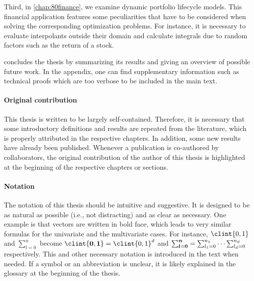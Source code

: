 Third, in \cref{chap:80finance},
we examine dynamic portfolio lifecycle models.
This financial application features some peculiarities that have
to be considered when solving the corresponding optimization problems.
For instance, it is necessary to evaluate interpolants outside their domain
and calculate integrals due to random factors such as the return of a stock.

 concludes the thesis by
summarizing its results and giving an overview of possible future work.
In the appendix, one can find supplementary information such as
technical proofs which are too verbose to be included in the main text.

\paragraph{Original contribution}

This thesis is written to be largely self-contained.
Therefore, it is necessary that some introductory definitions and
results are repeated from the literature,
which is properly attributed in the respective chapters.
In addition, some new results have already been published.
Whenever a publication is co-authored by collaborators,
the original contribution of the author of this thesis is highlighted
at the beginning of the respective chapters or sections.

\paragraph{Notation}

The notation of this thesis should be intuitive and suggestive.
It is designed to be as natural as possible (i.e., not distracting)
and as clear as necessary.
One example is that vectors are written in bold face, which leads to
very similar formulas for the univariate and the multivariate cases.
For instance, $\clint{0, 1}$ and $\sum_{l=0}^n$
become
$\clint{\*0, \*1} = \clint{0, 1}^d$ and
$\sum_{{\boldsymbol{l}}={\boldsymbol{0}}}^{{\boldsymbol{n}}} = \sum_{l_1=0}^{n_1} \dotsb \sum_{l_d=0}^{n_d}$
respectively.
This and other necessary notation is introduced in the text when needed.
If a symbol or an abbreviation is unclear,
it is likely explained in the glossary at the beginning of the thesis.

\cleardoublepage
